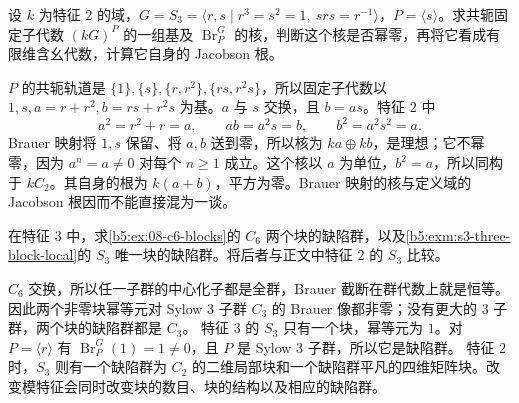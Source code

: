 \begin{optionalexercise}\label{b5:ex:08-brauer-domain}
	设 \(k\) 为特征 \(2\) 的域，\(G=S_3=\langle r,s\mid r^3=s^2=1,\ srs=r^{-1}\rangle\)，\(P=\langle s\rangle\)。求共轭固定子代数 \((kG)^P\) 的一组基及 \(\operatorname{Br}_P^G\) 的核，判断这个核是否幂零，再将它看成有限维含幺代数，计算它自身的 Jacobson 根。
\end{optionalexercise}
\begin{solution}
	\(P\) 的共轭轨道是 \(\{1\},\{s\},\{r,r^2\},\{rs,r^2s\}\)，所以固定子代数以 \(1,s,a=r+r^2,b=rs+r^2s\) 为基。\(a\) 与 \(s\) 交换，且 \(b=as\)。特征 \(2\) 中
	\[
		a^2=r^2+r=a,\qquad ab=a^2s=b,\qquad b^2=a^2s^2=a.
	\]
	Brauer 映射将 \(1,s\) 保留、将 \(a,b\) 送到零，所以核为 \(ka\oplus kb\)，是理想；它不幂零，因为 \(a^n=a\ne0\) 对每个 \(n\ge1\) 成立。这个核以 \(a\) 为单位，\(b^2=a\)，所以同构于 \(kC_2\)。其自身的根为 \(k(a+b)\)，平方为零。Brauer 映射的核与定义域的 Jacobson 根因而不能直接混为一谈。
\end{solution}

\begin{optionalexercise}\label{b5:ex:08-defect-change-prime}
	在特征 \(3\) 中，求\cref{b5:ex:08-c6-blocks}的 \(C_6\) 两个块的缺陷群，以及\cref{b5:exm:s3-three-block-local}的 \(S_3\) 唯一块的缺陷群。将后者与正文中特征 \(2\) 的 \(S_3\) 比较。
\end{optionalexercise}
\begin{solution}
	\(C_6\) 交换，所以任一子群的中心化子都是全群，Brauer 截断在群代数上就是恒等。因此两个非零块幂等元对 Sylow \(3\) 子群 \(C_3\) 的 Brauer 像都非零；没有更大的 \(3\) 子群，两个块的缺陷群都是 \(C_3\)。 特征 \(3\) 的 \(S_3\) 只有一个块，幂等元为 \(1\)。对 \(P=\langle r\rangle\) 有 \(\operatorname{Br}_P^G(1)=1\neq0\)，且 \(P\) 是 Sylow \(3\) 子群，所以它是缺陷群。 特征 \(2\) 时，\(S_3\) 则有一个缺陷群为 \(C_2\) 的二维局部块和一个缺陷群平凡的四维矩阵块。改变模特征会同时改变块的数目、块的结构以及相应的缺陷群。
\end{solution}

